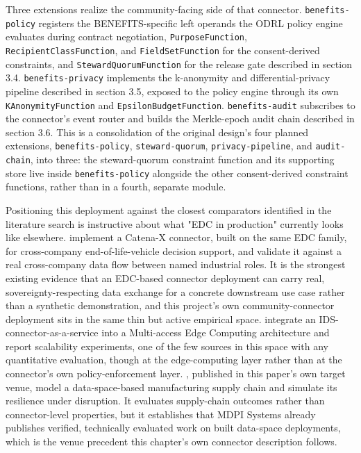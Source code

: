 Three extensions realize the community-facing side of that connector. \texttt{benefits-policy} registers the BENEFITS-specific left operands the ODRL policy engine evaluates during contract negotiation, \texttt{PurposeFunction}, \texttt{RecipientClassFunction}, and \texttt{FieldSetFunction} for the consent-derived constraints, and \texttt{StewardQuorumFunction} for the release gate described in section 3.4. \texttt{benefits-privacy} implements the k-anonymity and differential-privacy pipeline described in section 3.5, exposed to the policy engine through its own \texttt{KAnonymityFunction} and \texttt{EpsilonBudgetFunction}. \texttt{benefits-audit} subscribes to the connector's event router and builds the Merkle-epoch audit chain described in section 3.6. This is a consolidation of the original design's four planned extensions, \texttt{benefits-policy}, \texttt{steward-quorum}, \texttt{privacy-pipeline}, and \texttt{audit-chain}, into three: the steward-quorum constraint function and its supporting store live inside \texttt{benefits-policy} alongside the other consent-derived constraint functions, rather than in a fourth, separate module.

Positioning this deployment against the closest comparators identified in the literature search is instructive about what "EDC in production" currently looks like elsewhere. \cite{mugge2023} implement a Catena-X connector, built on the same EDC family, for cross-company end-of-life-vehicle decision support, and validate it against a real cross-company data flow between named industrial roles. It is the strongest existing evidence that an EDC-based connector deployment can carry real, sovereignty-respecting data exchange for a concrete downstream use case rather than a synthetic demonstration, and this project's own community-connector deployment sits in the same thin but active empirical space. \cite{kalogeropoulos2023} integrate an IDS-connector-as-a-service into a Multi-access Edge Computing architecture and report scalability experiments, one of the few sources in this space with any quantitative evaluation, though at the edge-computing layer rather than at the connector's own policy-enforcement layer. \cite{norikane2025}, published in this paper's own target venue, model a data-space-based manufacturing supply chain and simulate its resilience under disruption. It evaluates supply-chain outcomes rather than connector-level properties, but it establishes that MDPI Systems already publishes verified, technically evaluated work on built data-space deployments, which is the venue precedent this chapter's own connector description follows.

